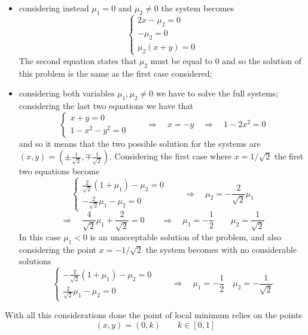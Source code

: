 \begin{example}{}
\begin{itemize}
			\item considering instead $\mu_1 = 0$ and $\mu_2 \neq 0$ the system becomes
			\[ \begin{cases}
				2x - \mu_2 = 0 \\ 
				-\mu_2 = 0 \\
				\mu_2(x+y) = 0
			\end{cases} \]
			The second equation states that $\mu_2$ must be equal to $0$ and so the solution of this problem is the same as the first case considered;
			
			\item considering both variables $\mu_1,\mu_2 \neq 0$ we have to solve the full systems; considering the last two equations we have that
			\[ \begin{cases}
				x+y = 0 \\ 1-x^2-y^2 = 0
			\end{cases} \qquad \Rightarrow \quad x = -y \quad \Rightarrow \quad 1-2x^2 = 0\]
			and so it means that the two possible solution for the systems are $(x,y) = \left( \pm \frac{1}{\sqrt{2}}, \mp \frac{1}{\sqrt{2}} \right)$. Considering the first case where $x = 1/\sqrt 2$ the first two equations become
			\[ \begin{cases}
				\frac{2}{\sqrt 2} (1+\mu_1) - \mu_2 = 0 \\
				-\frac 2 {\sqrt 2} \mu_1 - \mu_2 = 0
			\end{cases} \qquad \Rightarrow \quad \mu_2 = - \frac 2 {\sqrt 2} \mu_1 \]
			\[ \Rightarrow \quad \frac{4}{\sqrt 2} \mu_1 + \frac{2}{\sqrt 2} = 0 \qquad \Rightarrow \quad \mu_1 = - \frac 1 2 \qquad \mu_2 = \frac 1 {\sqrt 2}   \]
			In this case $\mu_1 < 0 $ is an unacceptable solution of the problem, and also considering the point $x = -1/\sqrt 2$ the system becomes with no considerable solutions
			\[ \begin{cases}
				-\frac{2}{\sqrt 2} (1+\mu_1) - \mu_2 = 0 \\
				\frac 2 {\sqrt 2} \mu_1 - \mu_2 = 0
			\end{cases} \qquad \Rightarrow \quad \mu_1 = -\frac 12\quad \mu_2 =  - \frac 1 {\sqrt 2}  \]			
		\end{itemize}
		With all this considerations done the point of local minimum relies on the points
		\[ (x,y) = (0,k) \qquad k\in[0,1] \]
	\end{example}
	
